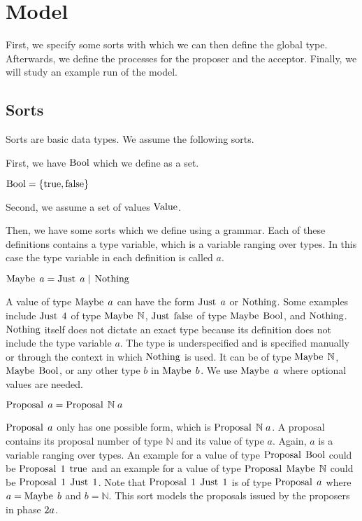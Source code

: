 \chapter{Model}
First, we specify some sorts with which we can then define the global type.
Afterwards, we define the processes for the proposer and the acceptor.
Finally, we will study an example run of the model.

\section{Sorts}
Sorts are basic data types.
We assume the following sorts.

First, we have $\operatorname{Bool}$ which we define as a set.

$\operatorname{Bool} = \left\{\operatorname{true}, \operatorname{false}\right\}$

Second, we assume a set of values $\operatorname{Value}$.

Then, we have some sorts which we define using a grammar.
Each of these definitions contains a type variable, which is a variable ranging over types.
In this case the type variable in each definition is called $a$.

$\operatorname{Maybe}\; a = \operatorname{Just}\; a \; | \; \operatorname{Nothing}$

A value of type $\operatorname{Maybe}\; a$ can have the form $\operatorname{Just}\; a$ or $\operatorname{Nothing}$.
Some examples include $\operatorname{Just}\; 4$ of type $\operatorname{Maybe}\; \mathbb{N}$, $\operatorname{Just}\; \operatorname{false}$ of type $\operatorname{Maybe}\; \operatorname{Bool}$, and $\operatorname{Nothing}$.
$\operatorname{Nothing}$ itself does not dictate an exact type because its definition does not include the type variable $a$.
The type is underspecified and is specified manually or through the context in which $\operatorname{Nothing}$ is used.
It can be of type $\operatorname{Maybe}\; \mathbb{N}$, $\operatorname{Maybe}\; \operatorname{Bool}$, or any other type $b$ in $\operatorname{Maybe}\; b$.
We use $\operatorname{Maybe}\; a$ where optional values are needed.

$\operatorname{Proposal}\; a = \operatorname{Proposal}\; \mathbb{N}\; a$

$\operatorname{Proposal}\; a$ only has one possible form, which is $\operatorname{Proposal}\; \mathbb{N}\; a$.
A proposal contains its proposal number of type $\mathbb{N}$ and its value of type $a$.
Again, $a$ is a variable ranging over types.
An example for a value of type $\operatorname{Proposal}\; \operatorname{Bool}$ could be $\operatorname{Proposal}\; 1\; \operatorname{true}$ and an example for a value of type $\operatorname{Proposal}\; \operatorname{Maybe}\; \mathbb{N}$ could be $\operatorname{Proposal}\; 1\; \operatorname{Just}\; 1$.
Note that $\operatorname{Proposal}\; 1\; \operatorname{Just}\; 1$ is of type $\operatorname{Proposal}\; a$ where $a = \operatorname{Maybe}\; b$ and $b = \mathbb{N}$.
This sort models the proposals issued by the proposers in phase $2a$.


